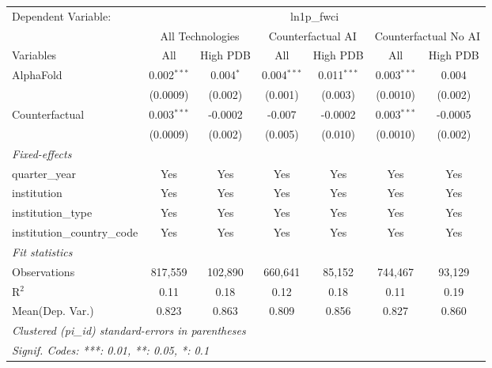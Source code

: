 \begingroup
\centering
\begin{tabular}{lcccccc}
   \tabularnewline \midrule \midrule
   Dependent Variable: & \multicolumn{6}{c}{ln1p\_fwci}\\
 & \multicolumn{2}{c}{All Technologies} & \multicolumn{2}{c}{Counterfactual AI} & \multicolumn{2}{c}{Counterfactual No AI} \\
\cmidrule(lr){1-1}\cmidrule(lr){2-3} \cmidrule(lr){4-5} \cmidrule(lr){6-7}
Variables & \multicolumn{1}{c}{All} & \multicolumn{1}{c}{High PDB} & \multicolumn{1}{c}{All} & \multicolumn{1}{c}{High PDB} & \multicolumn{1}{c}{All} & \multicolumn{1}{c}{High PDB} \\
\cmidrule(lr){1-1}\cmidrule(lr){2-2} \cmidrule(lr){3-3} \cmidrule(lr){4-4} \cmidrule(lr){5-5} \cmidrule(lr){6-6} \cmidrule(lr){7-7}
   AlphaFold                    & 0.002$^{***}$ & 0.004$^{*}$ & 0.004$^{***}$ & 0.011$^{***}$ & 0.003$^{***}$ & 0.004\\   
                                & (0.0009)      & (0.002)     & (0.001)       & (0.003)       & (0.0010)      & (0.002)\\   
   Counterfactual               & 0.003$^{***}$ & -0.0002     & -0.007        & -0.0002       & 0.003$^{***}$ & -0.0005\\   
                                & (0.0009)      & (0.002)     & (0.005)       & (0.010)       & (0.0010)      & (0.002)\\   
   \midrule
   \emph{Fixed-effects}\\
   quarter\_year                & Yes           & Yes         & Yes           & Yes           & Yes           & Yes\\  
   institution                  & Yes           & Yes         & Yes           & Yes           & Yes           & Yes\\  
   institution\_type            & Yes           & Yes         & Yes           & Yes           & Yes           & Yes\\  
   institution\_country\_code   & Yes           & Yes         & Yes           & Yes           & Yes           & Yes\\  
   \midrule
   \emph{Fit statistics}\\
   Observations                 & 817,559       & 102,890     & 660,641       & 85,152        & 744,467       & 93,129\\  
   R$^2$                        & 0.11          & 0.18        & 0.12          & 0.18          & 0.11          & 0.19\\  
Mean(Dep. Var.) & 0.823 & 0.863 & 0.809 & 0.856 & 0.827 & 0.860 \\
   \midrule \midrule
   \multicolumn{7}{l}{\emph{Clustered (pi\_id) standard-errors in parentheses}}\\
   \multicolumn{7}{l}{\emph{Signif. Codes: ***: 0.01, **: 0.05, *: 0.1}}\\
\end{tabular}
\par\endgroup
